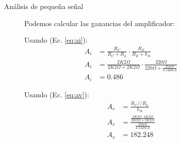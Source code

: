 \begin{frame}[allowframebreaks]{Análisis de pequeña señal}
  \begin{figure}[!ht]
    \raggedright
    Podemos calcular las ganancias del amplificador:\\
    \centering
    \begin{minipage}[t]{0.45\textwidth}
      Usando (Ec. \ref{eq:ai}):
      \small
      \begin{align*}
        A_i &= \frac{R_C}{R_C + R_L} \cdot \frac{R_E}{R_E + h_{ib}}\\[6pt]
        A_i &= \frac{2K2\Omega}{2K2\Omega + 2K2\Omega} \cdot \frac{220\Omega}{220\Omega + \frac{25mV}{4.142mA}}\\[6pt]
        A_i &= 0.486
      \end{align*}
    \end{minipage}
    \hfill
    \begin{minipage}[t]{0.45\textwidth}
      Usando (Ec. \ref{eq:av}):
      \small
      \begin{align*}
        A_v &= \frac{R_C // R_L}{h_{ib}}\\[6pt]
        A_v &= \frac{\frac{2K2\Omega \cdot 2K2\Omega}{2K2\Omega + 2K2\Omega}}{\frac{25mV}{4.142mA}}\\[6pt]
        A_v &= 182.248
      \end{align*}
    \end{minipage}
  \end{figure}

\end{frame}

